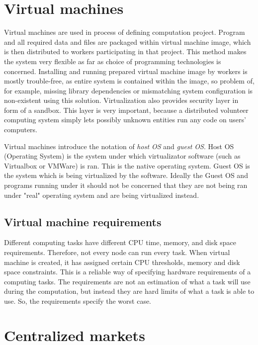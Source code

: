 \section{Virtual machines}
\label{sec:vms}

Virtual machines are used in process of defining computation project. Program and all required data and files are packaged within virtual machine image, which is then distributed to workers participating in that project. This method makes the system very flexible as far as choice of programming technologies is concerned. Installing and running prepared virtual machine image by workers is mostly trouble-free, as entire system is contained within the image, so problem of, for example, missing library dependencies or mismatching system configuration is non-existent using this solution. Virtualization also provides security layer in form of a sandbox. This layer is very important, because a distributed volunteer computing system simply lets possibly unknown entities run any code on users' computers.

Virtual machines introduce the notation of \emph{host OS} and \emph{guest OS}. Host OS (Operating System) is the system under which virtualizator software (such as Virtualbox or VMWare) is ran. This is the native operating system. Guest OS is the system which is being virtualized by the software. Ideally the Guest OS and programs running under it should not be concerned that they are not being ran under "real" operating system and are being virtualized instead.

\subsection{Virtual machine requirements}

Different computing tasks have different CPU time, memory, and disk space requirements. Therefore, not every node can run every task. When virtual machine is created, it has assigned certain CPU thresholds, memory and disk space constraints. This is a reliable way of specifying hardware requirements of a computing tasks. The requirements are not an estimation of what a task will use during the computation, but instead they are hard limits of what a task is able to use. So, the requirements specify the worst case.

\section{Centralized markets}

